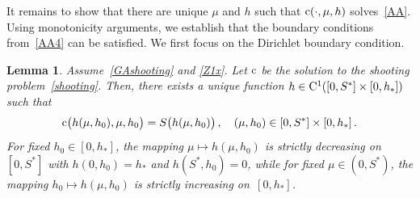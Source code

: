 \documentclass[reqno,11pt]{amsart}
\newtheorem{lem}[thm]{Lemma}
\numberwithin{equation}{section}
\begin{document}
It remains to show that there are unique $\mu$ and $h$ such that ${\rm c}(\cdot,\mu,h)$ solves~\eqref{AA}. Using  monotonicity arguments, we establish that the boundary conditions from~\eqref{AA4} can be satisfied. We first focus on the Dirichlet boundary condition.


\begin{lem}\label{L21}
Assume~\eqref{GAshooting} and \eqref{Z1x}.
Let ${\rm c}$  be the solution to the shooting problem~\eqref{shooting}.
Then, there exists a unique function $h\in {\rm C}^1([0,S^*]\times [0,h_*])$   such that 
\begin{align}\label{id}
{\rm c}\big(h(\mu,h_0),\mu,h_0\big)=S\big(h(\mu,h_0)\big)\,,\quad (\mu,h_0)\in [0,S^*]\times [0,h_*]\,.
\end{align}
For fixed $h_0\in [0,h_*]$, the mapping $\mu\mapsto h(\mu,h_0)$ is strictly decreasing on $[0,S^*]$ 
with $h(0,h_0)=h_*$ and $h(S^*,h_0)=0$, while for fixed $\mu\in (0,S^*)$, the mapping $h_0\mapsto h(\mu,h_0)$ is strictly increasing on~$[0,h_*]$.
\end{lem}
\end{document}
